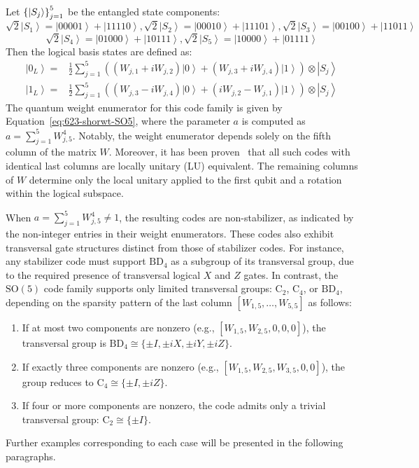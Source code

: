 \documentclass[8pt]{article}
\theoremstyle{definition}
\begin{document}
Let \(\left\{\ket{S_j}\right\}_{j=1}^5\) be the entangled state components:
\[ \sqrt{2}\left|S_{1}\right\rangle =\left|00001\right\rangle +\left|11110\right\rangle ,\sqrt{2}\left|S_{2}\right\rangle =\left|00010\right\rangle +\left|11101\right\rangle ,\sqrt{2}\left|S_{3}\right\rangle =\left|00100\right\rangle +\left|11011\right\rangle \]
\[ \sqrt{2}\left|S_{4}\right\rangle =\left|01000\right\rangle +\left|10111\right\rangle ,\sqrt{2}\left|S_{5}\right\rangle =\left|10000\right\rangle +\left|01111\right\rangle \]
Then the logical basis states are defined as:
\begin{equation}
    \begin{aligned}
        \left|0_{L}\right\rangle = & \frac{1}{2}\sum_{j=1}^{5}\left(\left(W_{j,1}+iW_{j,2}\right)\left|0\right\rangle +\left(W_{j,3}+iW_{j,4}\right)\left|1\right\rangle \right)\otimes\left|S_{j}\right\rangle \\
        \left|1_{L}\right\rangle = & \frac{1}{2}\sum_{j=1}^{5}\left(\left(W_{j,3}-iW_{j,4}\right)\left|0\right\rangle +\left(iW_{j,2}-W_{j,1}\right)\left|1\right\rangle \right)\otimes\left|S_{j}\right\rangle
    \end{aligned}
\end{equation}
The quantum weight enumerator for this code family is given by Equation~\eqref{eq:623-shorwt-SO5}, where the parameter \(a\) is computed as \(a = \sum_{j=1}^5 W_{j,5}^4\). Notably, the weight enumerator depends solely on the fifth column of the matrix \(W\). Moreover, it has been proven~\cite{du2024characterizing} that all such codes with identical last columns are locally unitary (LU) equivalent. The remaining columns of \(W\) determine only the local unitary applied to the first qubit and a rotation within the logical subspace.

When \(a = \sum_{j=1}^5 W_{j,5}^4 \ne 1\), the resulting codes are non-stabilizer, as indicated by the non-integer entries in their weight enumerators. These codes also exhibit transversal gate structures distinct from those of stabilizer codes. For instance, any stabilizer code must support \(\mathrm{BD}_4\) as a subgroup of its transversal group, due to the required presence of transversal logical \(X\) and \(Z\) gates. In contrast, the \(\mathrm{SO}(5)\) code family supports only limited transversal groups: \(\mathrm{C}_2\), \(\mathrm{C}_4\), or \(\mathrm{BD}_4\), depending on the sparsity pattern of the last column \([W_{1,5}, \dots, W_{5,5}]\) as follows:
\begin{enumerate}
    \item If at most two components are nonzero (e.g., \([W_{1,5}, W_{2,5}, 0, 0, 0]\)), the transversal group is \(\mathrm{BD}_4 \cong \{\pm I, \pm iX, \pm iY, \pm iZ\}\).
    \item If exactly three components are nonzero (e.g., \([W_{1,5}, W_{2,5}, W_{3,5}, 0, 0]\)), the group reduces to \(\mathrm{C}_4 \cong \{\pm I, \pm iZ\}\).
    \item If four or more components are nonzero, the code admits only a trivial transversal group: \(\mathrm{C}_2 \cong \{\pm I\}\).
\end{enumerate}
Further examples corresponding to each case will be presented in the following paragraphs.
\end{document}

